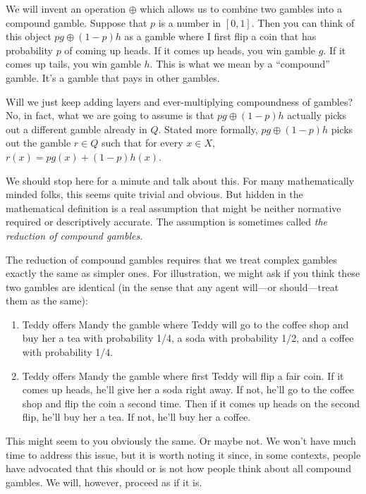 We will invent an operation $\oplus$ which allows us to combine two gambles into a compound gamble. Suppose that $p$ is a number in $[0,1]$.  Then you can think of this object $p g \oplus (1-p) h$ as a gamble where I first flip a coin that has probability $p$ of coming up heads. If it comes up heads, you win gamble $g$.  If it comes up tails, you win gamble $h$. This is what we mean by a ``compound'' gamble. It's a gamble that pays in other gambles.


Will we just keep adding layers and ever-multiplying compoundness of gambles?  No, in fact, what we are going to assume is that $pg \oplus (1-p)h$ actually picks out a different gamble already in $Q$. Stated more formally,  $p g \oplus (1-p) h$ picks out the gamble $r \in Q$ such that for every $x \in X$, $r(x) = p g(x) + (1-p) h(x) $.

We should stop here for a minute and talk about this.  For many mathematically minded folks, this seems quite trivial and obvious.  But hidden in the mathematical definition is a real assumption that might be neither normative required or descriptively accurate.  The assumption is sometimes called {\it the reduction of compound gambles}.  

The reduction of compound gambles requires that we treat complex gambles exactly the same as simpler ones.  For illustration, we might ask if you think these two gambles are identical (in the sense that any agent will---or should---treat them as the same):
\begin{enumerate}
\item Teddy offers Mandy the gamble where Teddy will go to the coffee shop and buy her a tea with probability 1/4, a soda with probability 1/2, and a coffee with probability 1/4.
\item Teddy offers Mandy the gamble where first Teddy will flip a fair coin. If it comes up heads, he'll give her a soda right away.  If not, he'll go to the coffee shop and flip the coin a second time.  Then if it comes up heads on the second flip, he'll buy her a tea. If not, he'll buy her a coffee.
\end{enumerate}
This might seem to you obviously the same.  Or maybe not.  We won't have much time to address this issue, but it is worth noting it since, in some contexts, people have advocated that this should or is not how people think about all compound gambles.  We will, however, proceed as if it is.

